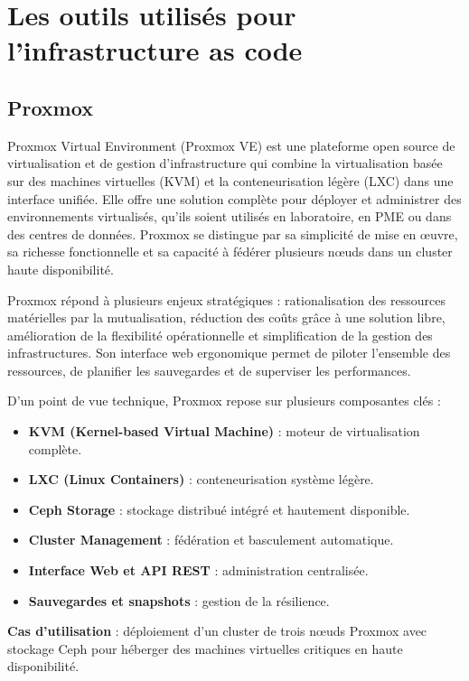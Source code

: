 \section{Les outils utilisés pour l’infrastructure as code}

\subsection{Proxmox}

Proxmox Virtual Environment (Proxmox VE) est une plateforme open source de virtualisation et de gestion d’infrastructure qui combine la virtualisation basée sur des machines virtuelles (KVM) et la conteneurisation légère (LXC) dans une interface unifiée. Elle offre une solution complète pour déployer et administrer des environnements virtualisés, qu’ils soient utilisés en laboratoire, en PME ou dans des centres de données. Proxmox se distingue par sa simplicité de mise en œuvre, sa richesse fonctionnelle et sa capacité à fédérer plusieurs nœuds dans un cluster haute disponibilité.

Proxmox répond à plusieurs enjeux stratégiques : rationalisation des ressources matérielles par la mutualisation, réduction des coûts grâce à une solution libre, amélioration de la flexibilité opérationnelle et simplification de la gestion des infrastructures. Son interface web ergonomique permet de piloter l’ensemble des ressources, de planifier les sauvegardes et de superviser les performances.

D’un point de vue technique, Proxmox repose sur plusieurs composantes clés :
\begin{itemize}
	\item \textbf{KVM (Kernel-based Virtual Machine)} : moteur de virtualisation complète.
	\item \textbf{LXC (Linux Containers)} : conteneurisation système légère.
	\item \textbf{Ceph Storage} : stockage distribué intégré et hautement disponible.
	\item \textbf{Cluster Management} : fédération et basculement automatique.
	\item \textbf{Interface Web et API REST} : administration centralisée.
	\item \textbf{Sauvegardes et snapshots} : gestion de la résilience.
\end{itemize}

\textbf{Cas d’utilisation} : déploiement d’un cluster de trois nœuds Proxmox avec stockage Ceph pour héberger des machines virtuelles critiques en haute disponibilité.

